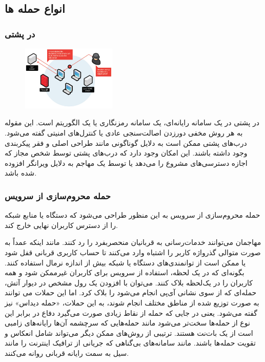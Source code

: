 \documentclass[12pt]{book}
\begin{document}
\subsection{انواع حمله ها}

\subsubsection{
در پشتی
}


\begin{figure}
  \vspace{-20pt}
  \begin{center}
    \includegraphics[width=0.4\textwidth]{./trendmicro_backdoor_chart2.jpg}
  \end{center}
  \vspace{-20pt}
  \caption{}
  \vspace{-10pt}
\end{figure}

در پشتی در یک سامانه رایانه‌ای، یک سامانه رمزنگاری یا یک الگوریتم است. این مقوله به هر روش مخفی دورزدن اصالت‌سنجی عادی یا کنترل‌های امنیتی گفته می‌شود. درب‌های پشتی ممکن است به دلایل گوناگونی مانند طراحی اصلی و فقر پیکربندی وجود داشته باشند. این امکان وجود دارد که درب‌های پشتی توسط شخص مجاز که اجازه دسترسی‌های مشروع را می‌دهد یا توسط یک مهاجم به دلایل ویرانگر افزوده شده باشد.

\subsubsection{حمله محروم‌سازی از سرویس
}

حمله محروم‌سازی از سرویس به این منظور طراحی می‌شود که دستگاه یا منابع شبکه را از دسترس کاربران نهایی خارج کند.

مهاجمان می‌توانند خدمات‌رسانی به قربانیان منحصربفرد را رد کنند. مانند اینکه عمداً به صورت متوالی گذرواژه کاربر را اشتباه وارد می‌کنند تا حساب کاربری قربانی قفل شود یا ممکن است از توانمندی‌های دستگاه یا شبکه بیش از اندازه نرمال استفاده کنند. بگونه‌ای که در یک لحظه، استفاده از سرویس برای کاربران غیرممکن شود و همه کاربران را در یک‌لحظه بلاک کنند. می‌توان با افزودن یک رول مشخص در دیوار آتش، حمله‌ای که از سوی نشانی آی‌پی انجام می‌شود را بلاک کرد. اما این حملات می توانند به صورت توزیع شده از مناطق مختلف انجام شوند، به این حملات، «حمله دیداس» 
 نیز گفته می‌شود. یعنی در جایی که حمله از نقاط زیادی صورت می‌گیرد دفاع در برابر این نوع از حمله‌ها سخت‌تر می‌شود مانند حمله‌هایی که سرچشمه آن‌ها رایانه‌های زامبی است از یک بات‌نت هستند. ترتیبی از روش‌های ممکن دیگر می‌تواند شامل انعکاس و تقویت حمله‌ها باشند. مانند سامانه‌های بی‌گناهی که جریانی از ترافیک اینترنت را مانند سیل به سمت رایانه قربانی روانه می‌کنند. 
\end{document}
